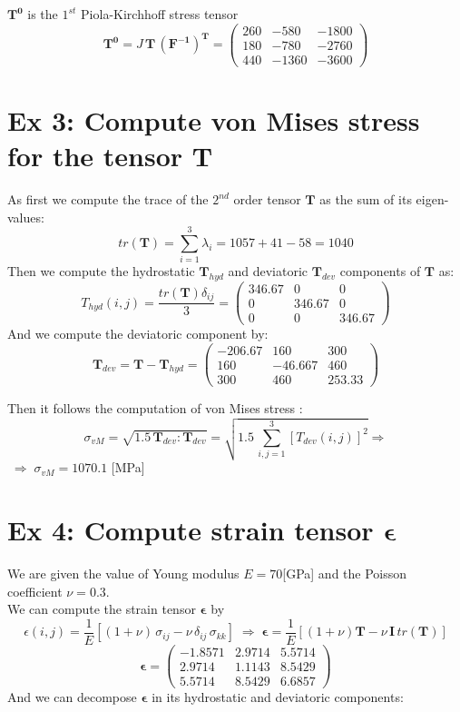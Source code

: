 \documentclass[a4paper,11pt]{article}
\begin{document}
$\mathbf{T^0}$ is the $1^{st}$ Piola-Kirchhoff stress tensor
\[ \mathbf{T^0}=J \,\mathbf{T} \, \mathbf{(F^{-1})^T}= \begin{pmatrix}
          260   &     -580   &    -1800\\
         180     &   -780    &   -2760\\
         440     &  -1360    &   -3600  \end{pmatrix}\]
         
\section{Ex 3: Compute von Mises stress for the tensor $\mathbf{T}$}
As first we compute the trace of the $2^{nd}$ order tensor $\mathbf{T}$ as the sum of its eigen-values:
\[  tr(\mathbf{T})=\sum_{i=1}^{3} \lambda_i=1057+41-58=1040 \]
Then we compute the hydrostatic $\mathbf{T}_{hyd}$ and deviatoric $\mathbf{T}_{dev}$ components of $\mathbf{T}$ as:
\[  T_{hyd}(i,j)=  \frac {tr(\mathbf{T}) \delta_{ij}}{3}= \begin{pmatrix}
       346.67      &      0     &       0\\
            0     &  346.67     &       0\\
            0       &     0   &    346.67 \end{pmatrix}  \]
And we compute the deviatoric component by:
\[ \mathbf{T}_{dev}= \mathbf{T}-\mathbf{T}_{hyd} = \begin{pmatrix}
      -206.67    &      160      &    300\\
          160    &  -46.667    &      460\\
          300     &     460  &     253.33 \end{pmatrix}  \]
          
Then it follows the computation of von Mises stress : 
\[ \sigma_{vM}=\sqrt{1.5 \, \mathbf{T}_{dev} : \mathbf{T}_{dev} }=\sqrt{1.5 \, \sum_{i,j=1}^{3} [T_{dev}(i,j)]^2 } \Rightarrow\] 
$ \; \Rightarrow \; \sigma_{vM}=1070.1$ [MPa]

\section{Ex 4: Compute strain tensor $\mathbf{\epsilon}$ }
We are given the value of Young modulus $E=70$[GPa] and the Poisson coefficient $\nu=0.3$. \\
We can compute the strain tensor $\mathbf{\epsilon}$ by
\[  \epsilon(i,j)=\frac{1}{E}[(1+\nu) \, \sigma_{ij}-\nu \, \delta_{ij} \, \sigma_{kk}] \; \Rightarrow \;  \mathbf{\epsilon}=\frac{1}{E}[(1+\nu ) \mathbf{T}-\nu \, \mathbf{I} \, tr(\mathbf{T})]\]
\[ \mathbf{\epsilon}= \begin{pmatrix}
      -1.8571    &   2.9714  &     5.5714\\
       2.9714    &   1.1143   &    8.5429\\
       5.5714    &   8.5429   &    6.6857 \end{pmatrix}\]
And we can decompose $\mathbf{\epsilon}$ in its hydrostatic and deviatoric components:
\end{document}
